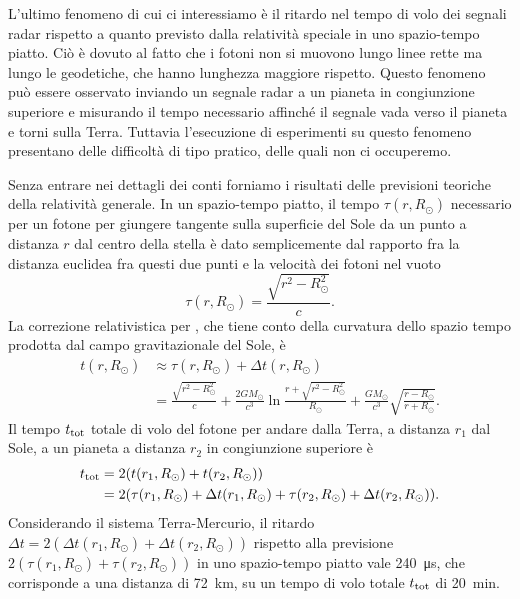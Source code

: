 L'ultimo fenomeno di cui ci interessiamo è il ritardo nel tempo di volo dei
segnali radar rispetto a quanto previsto dalla relatività speciale in uno
spazio-tempo piatto.  Ciò è dovuto al fatto che i fotoni non si muovono lungo
linee rette ma lungo le geodetiche, che hanno lunghezza maggiore rispetto.
Questo fenomeno può essere osservato inviando un segnale radar a un pianeta in
congiunzione superiore e misurando il tempo necessario affinché il segnale vada
verso il pianeta e torni sulla Terra.  Tuttavia l'esecuzione di esperimenti su
questo fenomeno presentano delle difficoltà di tipo pratico, delle quali non ci
occuperemo.

Senza entrare nei dettagli dei conti forniamo i risultati delle previsioni
teoriche della relatività generale.  In un spazio-tempo piatto, il tempo
$\tau(r,R_{\odot})$ necessario per un fotone per giungere tangente sulla
superficie del Sole da un punto a distanza $r$ dal centro della stella è dato
semplicemente dal rapporto fra la distanza euclidea fra questi due punti e la
velocità dei fotoni nel vuoto
\begin{equation}
  \tau(r, R_{\odot}) = \frac{\sqrt{r^{2} - R_{\odot}^{2}}}{c}.
\end{equation}
La correzione relativistica per , che tiene conto della curvatura dello spazio tempo
prodotta dal campo gravitazionale del Sole, è
\begin{equation}
  \begin{split}
    t(r,R_{\odot}) &\approx \tau(r,R_{\odot}) + \Delta t(r,R_{\odot}) \\
    &= \frac{\sqrt{r^{2} - R_{\odot}^{2}}}{c} + \frac{2GM_{\odot}}{c^{3}} \ln
    \frac{r + \sqrt{r^{2} - R_{\odot}^{2}}}{R_{\odot}} +
    \frac{GM_{\odot}}{c^{3}} \sqrt{\frac{r - R_{\odot}}{r + R_{\odot}}}.
  \end{split}
\end{equation}
Il tempo $t_{\textup{tot}}$ totale di volo del fotone per andare dalla Terra, a
distanza $r_{1}$ dal Sole, a un pianeta a distanza $r_{2}$ in congiunzione
superiore è
\begin{equation}
  \begin{split}
    t_{\textup{tot}} &= 2(t(r_{1},R_{\odot}) + t(r_{2},R_{\odot})) \\
    &= 2(\tau(r_{1},R_{\odot}) + \Delta t(r_{1},R_{\odot}) +
    \tau(r_{2},R_{\odot}) + \Delta t(r_{2},R_{\odot})).
  \end{split}
\end{equation}
Considerando il sistema Terra-Mercurio, il ritardo
$\Delta t = 2(\Delta t(r_{1},R_{\odot}) + \Delta t(r_{2},R_{\odot}))$ rispetto
alla previsione $2(\tau(r_{1},R_{\odot}) + \tau(r_{2},R_{\odot}))$ in uno
spazio-tempo piatto vale \SI{240}{\micro\second}, che corrisponde a una distanza
di \SI{72}{\kilo\metre}, su un tempo di volo totale $t_{\textup{tot}}$ di
\SI{20}{\minute}.

